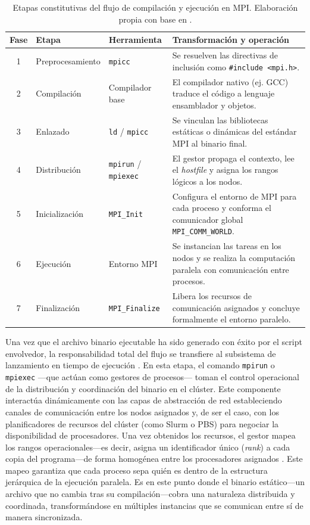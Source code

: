 \begin{table}[h]
\centering
\caption{Etapas constitutivas del flujo de compilación y ejecución en MPI. Elaboración propia con base en \cite{pacheco_2011, mpi_forum_2025, grama_intro_parallel_2003}.}
\label{tab:fases_flujo}
\begin{tabular}{|c|l|l|p{6cm}|}
\hline
\textbf{Fase} & \textbf{Etapa} & \textbf{Herramienta} & \textbf{Transformación y operación} \\ \hline
1 & Preprocesamiento & \texttt{mpicc} & Se resuelven las directivas de inclusión como \texttt{\#include <mpi.h>}. \\ \hline
2 & Compilación & Compilador base & El compilador nativo (ej. GCC) traduce el código a lenguaje ensamblador y objetos. \\ \hline
3 & Enlazado & \texttt{ld} / \texttt{mpicc} & Se vinculan las bibliotecas estáticas o dinámicas del estándar MPI al binario final. \\ \hline
4 & Distribución & \texttt{mpirun} / \texttt{mpiexec} & El gestor propaga el contexto, lee el \textit{hostfile} y asigna los rangos lógicos a los nodos. \\ \hline
5 & Inicialización & \texttt{MPI\_Init} & Configura el entorno de MPI para cada proceso y conforma el comunicador global \texttt{MPI\_COMM\_WORLD}. \\ \hline
6 & Ejecución & Entorno MPI & Se instancian las tareas en los nodos y se realiza la computación paralela con comunicación entre procesos. \\ \hline
7 & Finalización & \texttt{MPI\_Finalize} & Libera los recursos de comunicación asignados y concluye formalmente el entorno paralelo. \\ \hline
\end{tabular}
\end{table}

Una vez que el archivo binario ejecutable ha sido generado con éxito por el script envolvedor, la responsabilidad total del flujo se transfiere al subsistema de lanzamiento en tiempo de ejecución \cite{gropp_using_mpi_1999}. En esta etapa, el comando \texttt{mpirun} o \texttt{mpiexec} —que actúan como gestores de procesos— toman el control operacional de la distribución y coordinación del binario en el clúster. Este componente interactúa dinámicamente con las capas de abstracción de red \cite{open_mpi_2026} estableciendo canales de comunicación entre los nodos asignados y, de ser el caso, con los planificadores de recursos del clúster (como Slurm o PBS) para negociar la disponibilidad de procesadores. Una vez obtenidos los recursos, el gestor mapea los rangos operacionales—es decir, asigna un identificador único (\textit{rank}) a cada copia del programa—de forma homogénea entre los procesadores asignados \cite{open_mpi_2026}. Este mapeo garantiza que cada proceso sepa quién es dentro de la estructura jerárquica de la ejecución paralela. Es en este punto donde el binario estático—un archivo que no cambia tras su compilación—cobra una naturaleza distribuida y coordinada, transformándose en múltiples instancias que se comunican entre sí de manera sincronizada.

